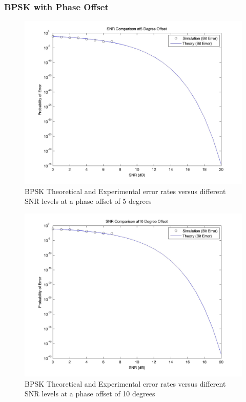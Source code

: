 \documentclass[]{article}
\begin{document}
\subsubsection{BPSK with Phase Offset}
\label{sec:bpsk_phase}
\begin{figure}[H]
\centering
\hspace*{-2cm}\includegraphics[width=1.3\textwidth]{bpSNRpo1.jpg}
\caption{BPSK Theoretical and Experimental error rates versus different SNR levels at a phase offset of 5 degrees }
\end{figure}

\begin{figure}[H]
\centering
\hspace*{-2cm}\includegraphics[width=1.3\textwidth]{bpSNRpo2.jpg}
\caption{BPSK Theoretical and Experimental error rates versus different SNR levels at a phase offset of 10 degrees }
\end{figure}
\end{document}
